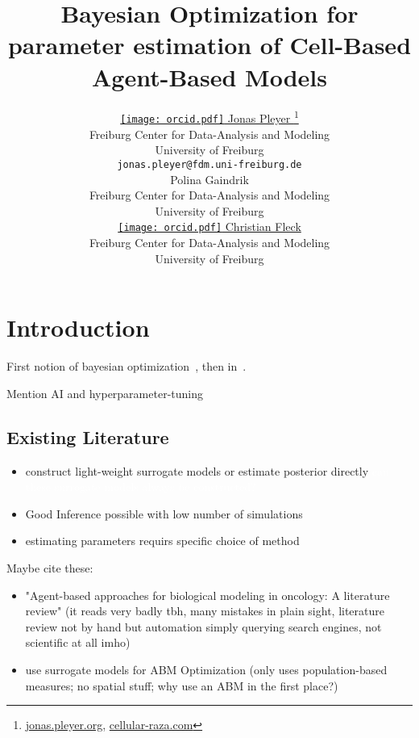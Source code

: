 \documentclass{article}
\title{Bayesian Optimization for parameter estimation of Cell-Based Agent-Based Models}
\author{
    \href{https://orcid.org/0009-0001-0613-7978}{
        \texttt{[image: orcid.pdf]}
        \hspace{1mm}Jonas Pleyer
    }
    \thanks{
        \href{https://jonas.pleyer.org}{jonas.pleyer.org},
        \href{https://cellular-raza.com}{cellular-raza.com}
    }\\
	Freiburg Center for Data-Analysis and Modeling\\
	University of Freiburg\\
	\texttt{jonas.pleyer@fdm.uni-freiburg.de} \\
	\And
    Polina Gaindrik\\
	Freiburg Center for Data-Analysis and Modeling\\
	University of Freiburg\\
	\And
	\href{https://orcid.org/0000-0002-6371-4495}{
        \texttt{[image: orcid.pdf]}
        \hspace{1mm}Christian Fleck
    }\\
	Freiburg Center for Data-Analysis and Modeling\\
	University of Freiburg
}
\newcommand{\todo}[1]{\colorbox{WildStrawberry}{\textcolor{white}{#1}}}
\begin{document}
\maketitle

\begin{abstract}
\end{abstract}



\section{Introduction}
\label{section:introduction}
First notion of bayesian optimization~\cite{Kushner1964}, then in~\cite{Mockus1978}.

Mention AI and hyperparameter-tuning

\subsection*{Existing Literature}
\cite{Jrgensen2022}
\begin{itemize}
    \item construct light-weight surrogate models or estimate posterior directly
        \todo{can these surrogate models always be constructed?}
    \item Good Inference possible with low number of simulations
    \item estimating parameters requirs specific choice of method
\end{itemize}

Maybe cite these:
\cite{Lima2021,Duswald2024}

\begin{itemize}
    \item \cite{Stephan2024} "Agent-based approaches for biological modeling in oncology: A
        literature review" (it reads very badly tbh, many mistakes in plain sight, literature review
        not by hand but automation simply querying search engines, not scientific at all imho)
    \item \cite{An2016} use surrogate models for ABM Optimization (only uses population-based
        measures; no spatial stuff; why use an ABM in the first place?)
\end{itemize}
\end{document}
